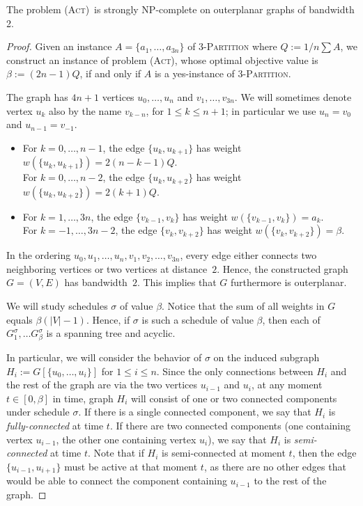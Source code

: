 \documentclass[runningheads]{llncs}
\numberwithin{equation}{section}
\newcommand{\set}[1]{\{ #1 \}}
\newcommand{\fromto}[2]{\set{#1, \ldots, #2}}
\newcommand{\act}{\textsc{(Act)}}
\newcommand{\vall}{w}
\begin{document}
\begin{theorem}
\label{thm:hardness_bandwidth}
The problem \act\ is strongly NP-complete on outerplanar graphs of bandwidth 2.
\end{theorem}
\begin{proof}
Given an instance $A = \fromto{a_1}{a_{3n}}$ of \textsc{3-Partition} where $Q := 1/n \sum A$, we construct an instance of problem {\act}, whose optimal objective value is $\beta := (2n - 1)Q$, if and only if $A$ is a yes-instance of \textsc{3-Partition}.

The graph has $4n+1$ vertices $u_0,\ldots,u_n$ and $v_1,\ldots,v_{3n}$.
We will sometimes denote vertex $u_k$ also by the name $v_{k-n}$, for $1\le k\le n+1$;
in particular we use $u_n=v_0$ and $u_{n-1}=v_{-1}$.
\begin{itemize}
\item 
For $k=0,\ldots,n-1$,   the edge $\{u_k, u_{k+1}\}$ has weight $\vall(\{u_k, u_{k+1}\}) = 2(n-k-1)Q$.\\
For $k=0,\ldots,n-2$,   the edge $\{u_k, u_{k+2}\}$ has weight $\vall(\{u_k, u_{k+2}\})=2(k+1)Q$.
\item 
For $k=1,\ldots,3n$,    the edge $\{v_{k-1}, v_k\}$ has weight $\vall(\{v_{k-1}, v_k\})=a_k$.\\
For $k=-1,\ldots,3n-2$, the edge $\{v_k, v_{k+2}\}$ has weight $\vall(\{v_k, v_{k+2}\})=\beta$.  
\end{itemize}
In the ordering $u_0,u_1,\ldots,u_n,v_1,v_2,\ldots,v_{3n}$, every edge either connects two neighboring 
vertices or two vertices at distance~$2$. Hence, the constructed graph $G=(V,E)$ has bandwidth~$2$. 
This implies that $G$ furthermore is outerplanar.

We will study schedules $\sigma$ of value $\beta$. Notice that the sum of all weights in $G$ equals $\beta(|V| - 1)$. Hence, if $\sigma$ is such a schedule of value $\beta$, then each of $G^\sigma_1, \dots G^\sigma_\beta$ is a spanning tree and acyclic.

In particular, we will consider the behavior of $\sigma$ on the induced subgraph $H_i := G[\fromto{u_0}{u_i}]$ for $1\le i\le n$.
Since the only connections between $H_i$ and the rest of the graph are via the two vertices $u_{i-1}$ and $u_i$,
at any moment $t\in [0,\beta]$ in time, graph $H_i$ will consist of one or two connected components
under schedule $\sigma$.
If there is a single connected component, we say that $H_i$ is \emph{fully-connected} at time $t$.
If there are two connected components (one containing vertex $u_{i-1}$, the other one containing 
vertex $u_i$), we say that $H_i$ is \emph{semi-connected} at time $t$.
Note that if $H_i$ is semi-connected at moment $t$, then the edge $\{u_{i-1}, u_{i+1}\}$ must be active at 
that moment $t$, as there are no other edges that would be able to connect the component containing 
$u_{i-1}$ to the rest of the graph.


\end{proof}
\end{document}
